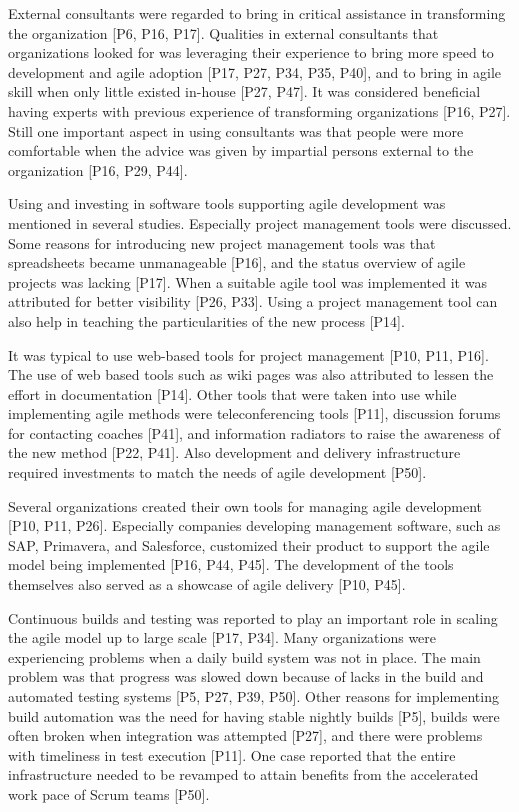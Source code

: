 \documentclass[preprint,authoryear,12pt]{elsarticle}
\begin{document}
External consultants were regarded to bring in critical assistance in
transforming the organization [P6, P16, P17]. Qualities in external consultants
that organizations looked for was leveraging their experience to bring more
speed to development and agile adoption [P17, P27, P34, P35, P40], and to bring
in agile skill when only little existed in-house [P27, P47]. It was considered
beneficial having experts with previous experience of transforming organizations
[P16, P27].
Still one important aspect in using consultants was that people were more
comfortable when the advice was given by impartial persons external to the
organization [P16, P29, P44].




Using and investing in software tools supporting agile development was mentioned
in several studies. Especially project management tools were discussed.
Some reasons for introducing new project management tools was that spreadsheets
became unmanageable [P16], and the status overview of agile projects was lacking
[P17]. When a suitable agile tool was implemented it was attributed for better
visibility [P26, P33]. Using a project management tool can also help in teaching
the particularities of the new process [P14].

It was typical to use web-based tools for project management [P10, P11, P16].
The use of web based tools such as wiki pages was also attributed to lessen the
effort in documentation [P14]. Other tools that were taken into use while
implementing agile methods were teleconferencing tools [P11], discussion forums
for contacting coaches [P41], and information radiators to raise the awareness
of the new method [P22, P41]. Also development and delivery infrastructure
required investments to match the needs of agile development [P50]. 

Several organizations created their own tools for managing agile development
[P10, P11, P26]. Especially companies developing management software, such as
SAP, Primavera, and Salesforce, customized their product to support the agile
model being implemented [P16, P44, P45]. The development of the tools themselves
also served as a showcase of agile delivery [P10, P45].


Continuous builds and testing was reported to play an important role in scaling
the agile model up to large scale [P17, P34]. Many organizations were
experiencing problems when a daily build system was not in place. The main
problem was that progress was slowed down because of lacks in the build and
automated testing systems [P5, P27, P39, P50].
Other reasons for implementing build automation was the need for having stable
nightly builds [P5], builds were often broken when integration was attempted
[P27], and there were problems with timeliness in test execution [P11]. One case
reported that the entire infrastructure needed to be revamped to attain benefits
from the accelerated work pace of Scrum teams [P50].
\end{document}
